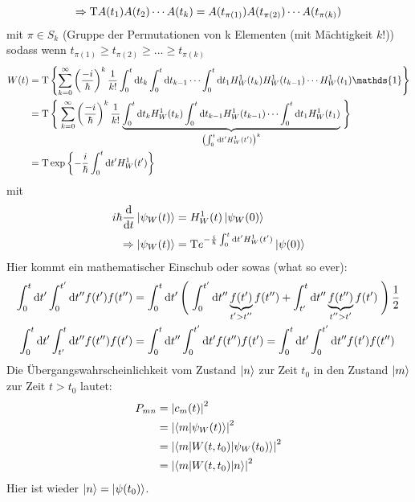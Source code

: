 		\begin{equation*}
		\Rightarrow \mathrm{T} A(t_1) A(t_2) \cdots A(t_k) = A(t_{\pi(1)}) A(t_{\pi(2)}) \cdots A(t_{\pi(k)})
		\end{equation*}
		mit $\pi \in S_k$ (Gruppe der Permutationen von k Elementen (mit Mächtigkeit $k!$))
		sodass wenn $t_{\pi(1)} \geq t_{\pi(2)} \geq \ldots \geq t_{\pi(k)}$
		\begin{align*}
		W(t) &= \T 
		\left\{
		\sum_{k=0}^\infty \left( \frac{-i}{\hbar}\right)^k \frac{1}{k!} 
		\int_{0}^{t} \diff t_k \int_{0}^{t} \diff t_{k-1} \cdots
		\int_{0}^{t} \diff t_1 
		H_W^1(t_k) H_W^1(t_{k-1}) \cdots H_W^1(t_1) \mathds{1} 
		\right\} \\
		&= \T
		\left\{\vphantom{\sum_{k=0}^{\infty}} \right.
		\sum_{k=0}^{\infty} 
		\left( \frac{-i}{\hbar}\right)^k \frac{1}{k!}
		\underbrace{
			\int_{0}^{t} \diff t_k H_W^1(t_k) 
			\int_{0}^{t} \diff t_{k-1} H_W^1(t_{k-1}) \cdots
			\int_{0}^{t} \diff t_1 H_W^1(t_1)
		}_{\mathclap{\left( \int_{0}^{t} \diff t' H_W^1(t') \right)^k }}
		\left. \vphantom{\sum_{k=0}^{\infty}}\right\} \\
		&= \T \exp 
		\left\{
		- \frac{i}{\hbar} \int_{0}^{t} \diff t' H_W^1(t')
		\right\}
		\end{align*}
		mit
		\begin{align*}
		i\hbar \frac{\mathrm{d}}{\mathrm{d} t} \ket{\psi_W(t)} &= H_W^1(t) \ket{\psi_W(0)} \\
		\Rightarrow 
		\ket{\psi_W(t)} &= \mathrm{T} e^{-\frac{i}{\hbar} \int_{0}^{t} \mathrm{d} t' H_W^1(t')} \ket{\psi(0)}
		\end{align*}
		Hier kommt ein mathematischer Einschub oder sowas (what so ever):
		\begin{align*}
		\int_{0}^{t} \diff t' \int_{0}^{t'} \diff t'' f(t') f(t'') 
		&= \int_{0}^{t} \diff t' 
		\left( \vphantom{\int_{0}^{t'} \diff t''} \right.
		\int_{0}^{t'} \diff t'' \underbrace{f(t')}_{\mathclap{t' > t''}} f(t'') 
		+ \int_{t'}^{t} \diff t'' \underbrace{f(t'')}_{\mathclap{t'' > t'}} f(t')
		\left. \vphantom{\int_{0}^{t'} \diff t''} 
		\right) 
		\frac{1}{2} \\
		\int_{0}^{t} \diff t' \int_{t'}^{t} \diff t'' f(t'') f(t') 
		&= \int_{0}^{t} \diff t'' \int_{0}^{t'} \diff t' f(t'') f(t') = \int_{0}^{t} \diff t' \int_{0}^{t'} \diff t'' f(t') f(t'') 
		\end{align*}	
		Die Übergangswahrscheinlichkeit vom Zustand $\ket{n}$ zur Zeit $t_0$ in den Zustand $\ket{m}$ zur Zeit $t>t_0$ lautet:
		\begin{align*}
		P_{mn} &= \left| c_m(t) \right|^2 \\
		&= \left| \braket{m | \psi_W(t)} \right|^2 \\
		&= \left| \braket{m | W(t,t_0) | \psi_W(t_0)} \right|^2 \\
		&= \left| \braket{m | W(t,t_0) | n}\right|^2
		\end{align*}
		Hier ist wieder $\ket{n} = \ket{\psi(t_0)}$.